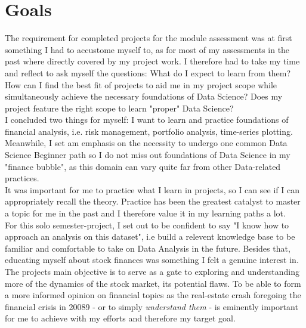 \documentclass[a4paper]{article}
\begin{document}
\section{Goals}
The requirement for completed projects for the module assessment was at first something I had to accustome myself to, as for most of my assessments in the past where directly covered by my project work. 
I therefore had to take my time and reflect to ask myself the questions: What do I expect to learn from them? How can I find the best fit of projects to aid me in my project scope while simultaneously achieve the necessary foundations of Data Science? 
Does my project feature the right scope to learn "proper" Data Science?
\\\newline
I concluded two things for myself: I want to learn and practice foundations of financial analysis, i.e. risk management, portfolio analysis, time-series plotting. 
Meanwhile, I set am emphasis on the necessity to undergo one common Data Science Beginner path so I do not miss out foundations of Data Science in my "finance bubble", as this domain can vary quite far from other Data-related practices.
\\\newline
It was important for me to practice what I learn in projects, so I can see if I can appropriately recall the theory. 
Practice has been the greatest catalyst to master a topic for me in the past and I therefore value it in my learning paths a lot.
\\\newline
For this solo semester-project, I set out to be confident to say "I know how to approach an analysis on this dataset", i.e build a relevent knowledge base to be familiar and comfortable to take on Data Analysis in the future. 
Besides that, educating myself about stock finances was something I felt a genuine interest in. The projects main objective is to serve as a gate to exploring and understanding more of the dynamics of the stock market, its potential flaws. 
To be able to form a more informed opinion on financial topics as the real-estate crash foregoing the financial crisis in 2008\/9 - or to simply \textit{understand them} - is eminently important for me to achieve with my efforts and therefore my target goal.
\end{document}
